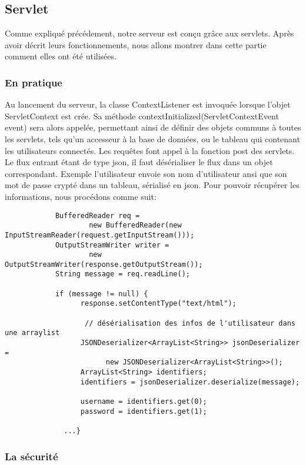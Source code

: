 \subsection{Servlet}
	
	Comme expliqué précédement, notre serveur est conçu grâce aux \glspl{servlet}.
	Après avoir décrit leurs fonctionnements, nous allons montrer dans cette partie
	comment elles ont été utilisées.
		
	\subsubsection{En pratique}
		Au lancement du serveur, la classe ContextListener est invoquée lorsque l'objet
		ServletContext est crée. Sa méthode contextInitialized(ServletContextEvent event) sera alors appelée, 
		permettant ainsi de définir des objets communs à toutes les
		\glspl{servlet}, tels qu'un accesseur à la base de données, ou le tableau qui
		contenant les utilisateurs connectés. Les requêtes font appel à la fonction
		post des \glspl{servlet}. Le flux entrant étant de type \gls{json}, il faut
		désérialiser le flux dans un objet correspondant. Exemple l'utilisateur envoie son nom d'utilisateur ansi que son mot de passe crypté
		dans un tableau, sérialisé en \gls{json}.
		Pour pouvoir récupérer les informations, nous procédons comme suit: 
		
		\begin{verbatim}
			BufferedReader req = 
				    new BufferedReader(new InputStreamReader(request.getInputStream()));
			OutputStreamWriter writer = 
				    new OutputStreamWriter(response.getOutputStream());
			String message = req.readLine();
			
			if (message != null) {
				  response.setContentType("text/html");
				
				   // désérialisation des infos de l'utilisateur dans une arraylist 
				  JSONDeserializer<ArrayList<String>> jsonDeserializer = 
					    new JSONDeserializer<ArrayList<String>>();
				  ArrayList<String> identifiers;
				  identifiers = jsonDeserializer.deserialize(message);
				
				  username = identifiers.get(0);
				  password = identifiers.get(1);
				  
			  ...}
		\end{verbatim}
		
		
	\subsubsection{La sécurité}
	

